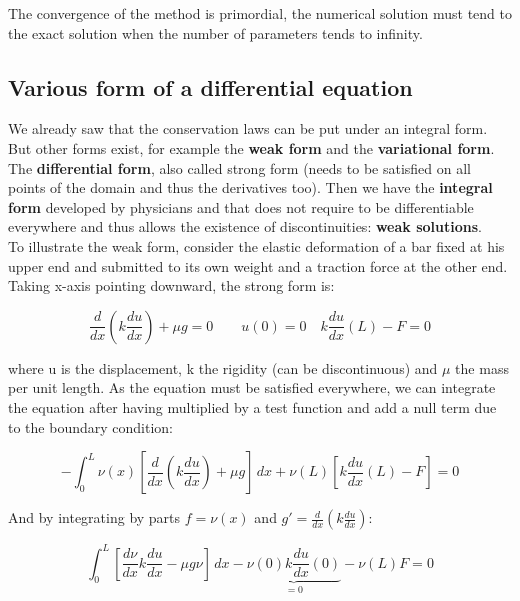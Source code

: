 The convergence of the method is primordial, the numerical solution must tend to the exact solution when the number of parameters tends to infinity.

\subsection{Various form of a differential equation}
We already saw that the conservation laws can be put under an integral form. But other forms exist, for example the \textbf{weak form} and the \textbf{variational form}. \\

The \textbf{differential form}, also called strong form (needs to be satisfied on all points of the domain and thus the derivatives too). Then we have the \textbf{integral form} developed by physicians and that does not require to be differentiable everywhere and thus allows the existence of discontinuities: \textbf{weak solutions}. \\

To illustrate the weak form, consider the elastic deformation of a bar fixed at his upper end and submitted to its own weight and a traction force at the other end. Taking x-axis pointing downward, the strong form is: 

\begin{equation}
\frac{d}{dx} \left( k\frac{du}{dx} \right) + \mu g = 0 \qquad u(0) = 0 \quad k\frac{du}{dx}(L) - F = 0
\end{equation} 

where u is the displacement, k the rigidity (can be discontinuous) and $\mu$ the mass per unit length. As the equation must be satisfied everywhere, we can integrate the equation after having multiplied by a test function and add a null term due to the boundary condition: 

\begin{equation}
-\int _0^L \nu (x) \left[ \frac{d}{dx} \left( k\frac{du}{dx} \right)+ \mu g\right]\, dx + \nu (L) \left[ k \frac{du}{dx}(L) - F \right] = 0
\end{equation}

And by integrating by parts $f = \nu (x)$ and $g' = \frac{d}{dx}(k\frac{du}{dx})$: 

\begin{equation}
\int _0 ^L \left[\frac{d\nu}{dx} k \frac{du}{dx} - \mu g \nu \right]\, dx - \underbrace{\nu (0)k\frac{du}{dx}(0)}_{=0} -\nu (L) F = 0
\end{equation}

